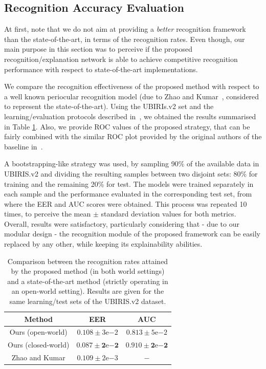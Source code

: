 \documentclass[final]{cvpr}
\begin{document}
\subsection{Recognition Accuracy Evaluation}
\label{subsec:quantitative_evaluation}

At first, note that we do not aim at providing a \emph{better} recognition framework than the state-of-the-art, in terms of the recognition rates.  Even though, our main purpose in this section was to perceive if the proposed recognition/explanation network is able to achieve competitive recognition performance with respect to state-of-the-art implementations.

We compare the recognition effectiveness of the proposed method with respect to a well known periocular recognition model (due to Zhao and Kumar~\cite{accurate_periocular_recognition},  considered to represent the state-of-the-art). Using the UBIRIs.v2 set \cite{ubiris_v2} and the learning/evaluation protocols described in~\cite{accurate_periocular_recognition}, we obtained the results summarised in Table \ref{tab:quantitative_evaluation}. Also, we provide  ROC values of the proposed strategy, that can be fairly combined with the similar ROC plot provided by the original authors of the baseline in~\cite{zhao_kumar_novel}.

A bootstrapping-like strategy was used, by sampling 90\% of the available data in UBIRIS.v2 and dividing the resulting samples between two disjoint sets: 80\% for training and the remaining 20\% for test. The models were trained separately in each sample and the performance evaluated in the corresponding test set, from where the EER and AUC scores were obtained. This process was repeated 10 times, to perceive the mean $\pm$ standard deviation values for both metrics. Overall, results were satisfactory, particularly considering that - due to our modular design - the recognition module of the proposed framework can be easily replaced by any other, while keeping its explainability abilities.

\begin{table}[!h]
\small
{\renewcommand{\arraystretch}{1.5}%
\begin{center}
 \begin{tabular}{|c | c | c|} 
 \hline
 \textbf{Method} & \textbf{EER} & \textbf{AUC} \\
 \hline
 \hline
 Ours (open-world) & $0.108 \pm 3\mathrm{e}{-2}$ & $0.813 \pm 5\mathrm{e}{-2}$ \\
 Ours (closed-world) & $\mathbf{0.087 \pm 2\mathrm{e}{-2}}$ & $\mathbf{0.910 \pm 2\mathrm{e}{-2}}$ \\
 Zhao and Kumar \cite{accurate_periocular_recognition} & $0.109 \pm 2\mathrm{e}{-3}$ & $-$ \\[1.5pt]
 \hline
\end{tabular}
\end{center}}
\caption{Comparison between the recognition rates attained by the proposed method (in both world settings) and a state-of-the-art method (strictly operating in an open-world setting). Results are given for the same learning/test sets of the UBIRIS.v2 dataset.}
\label{tab:quantitative_evaluation}
\end{table}
\end{document}
